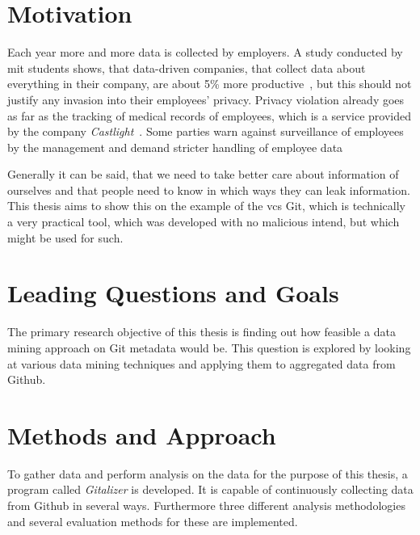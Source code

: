 \section{Motivation}
Each year more and more data is collected by employers.
A study conducted by \ac{mit} students shows, that data-driven companies, that collect data about everything in their company, are about 5\% more productive~\cite{article:management-revolution}, but this should not justify any invasion into their employees' privacy.
Privacy violation already goes as far as the tracking of medical records of employees, which is a service provided by the company \emph{Castlight}~\cite{article:medical-data}.
Some parties warn against surveillance of employees by the management and demand stricter handling of employee data~\cite{article:vermessung-belegschaft}

Generally it can be said, that we need to take better care about information of ourselves and that people need to know in which ways they can leak information.
This thesis aims to show this on the example of the \ac{vcs} Git, which is technically a very practical tool, which was developed with no malicious intend, but which might be used for such.

\section{Leading Questions and Goals}

The primary research objective of this thesis is finding out how feasible a data mining approach on Git metadata would be.
This question is explored by looking at various data mining techniques and applying them to aggregated data from Github.

\section{Methods and Approach}

To gather data and perform analysis on the data for the purpose of this thesis, a program called \emph{Gitalizer} is developed.
It is capable of continuously collecting data from Github in several ways.
Furthermore three different analysis methodologies and several evaluation methods for these are implemented.

